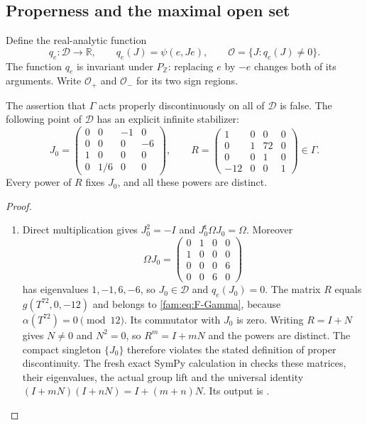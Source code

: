 \subsection{Properness and the maximal open set}\hypertarget{tag-01PX}{}\label{fam:section:F.2}

Define the real-analytic function
\[
 q_e:\mathcal D\longrightarrow\mathbb R,\qquad q_e(J)=\psi(e,Je),
 \qquad\mathcal O=\{J:q_e(J)\ne0\}.
\]
The function $q_e$ is invariant under $P_{\mathbb Z}$: replacing $e$ by
$-e$ changes both of its arguments.  Write $\mathcal O_+$ and
$\mathcal O_-$ for its two sign regions.

\begin{proposition}[counterexample]\hypertarget{tag-01RB}{}\label{fam:src:F.2.1}\label{fam:st:F.2.1}

The assertion that $\Gamma$ acts properly discontinuously on all of
$\mathcal D$ is false.  The following point of $\mathcal D$ has an
explicit infinite stabilizer:
\[
 J_0=\begin{pmatrix}
 0&0&-1&0\\0&0&0&-6\\1&0&0&0\\0&1/6&0&0
 \end{pmatrix},\qquad
 R=\begin{pmatrix}
 1&0&0&0\\0&1&72&0\\0&0&1&0\\-12&0&0&1
 \end{pmatrix}\in\Gamma.
\]
Every power of $R$ fixes $J_0$, and all these powers are distinct.
\end{proposition}



\begin{proof}
\begin{enumerate}[label=\arabic*.,leftmargin=*]
\item Direct multiplication gives $J_0^2=-I$ and
$J_0^{\mathsf t}\Omega J_0=\Omega$.  Moreover
\[
 \Omega J_0=\begin{pmatrix}
 0&1&0&0\\1&0&0&0\\0&0&0&6\\0&0&6&0
 \end{pmatrix}
\]
has eigenvalues $1,-1,6,-6$, so $J_0\in\mathcal D$ and $q_e(J_0)=0$.
The matrix $R$ equals $g(T^{72},0,-12)$ and belongs to \eqref{fam:eq:F-Gamma},
because $\alpha(T^{72})=0\pmod{12}$.  Its commutator with $J_0$ is zero.
Writing $R=I+N$ gives $N\ne0$ and $N^2=0$, so $R^m=I+mN$ and the
powers are distinct.  The compact singleton $\{J_0\}$ therefore violates
the stated definition of proper discontinuity.  The fresh exact SymPy calculation in
checks these matrices, their eigenvalues, the actual group lift and the
universal identity \((I+mN)(I+nN)=I+(m+n)N\).
Its output is
.
\end{enumerate}
\end{proof}

